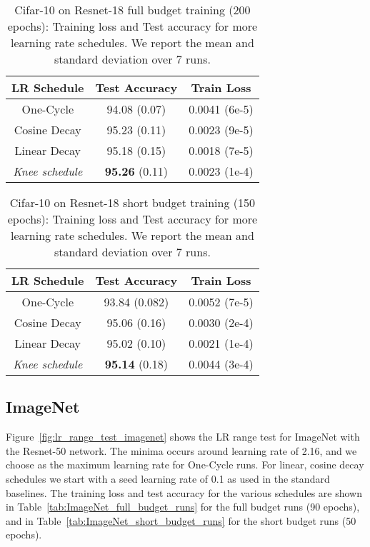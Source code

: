 \documentclass{article} \usepackage{iclr2021_conference,times}
\newcommand{\lrschedule}{\textit{Knee schedule}}
\begin{document}
\begin{table}[h!]
\small
\centering
\caption{Cifar-10 on Resnet-18 full budget training (200 epochs): Training loss and Test accuracy for more learning rate schedules. We report the mean and standard deviation over 7 runs.}
\label{tab:cifar_results_extra_baselines_full_budget}

\begin{tabular}{ccc}
  \toprule
  LR Schedule     & Test Accuracy  & Train Loss \\ 
  \midrule
  One-Cycle       & 94.08 (0.07)  & 0.0041 (6e-5) \\
  Cosine Decay    & 95.23 (0.11) & 0.0023 (9e-5)  \\
  Linear Decay    & 95.18 (0.15) & 0.0018 (7e-5)  \\
  \lrschedule{}   & \textbf{95.26} (0.11) & 0.0023 (1e-4)  \\ 
\bottomrule
\end{tabular}

\end{table}

\begin{table}[h!]
\small
\centering
\caption{Cifar-10 on Resnet-18 short budget training (150 epochs): Training loss and Test accuracy for more learning rate schedules. We report the mean and standard deviation over 7 runs.}
\label{tab:cifar_results_extra_baselines_short_budget}

\begin{tabular}{ccc}
  \toprule
  LR Schedule   & Test Accuracy   & Train Loss  \\ 
  \midrule
  One-Cycle     & 93.84 (0.082)    & 0.0052 (7e-5)   \\
  Cosine Decay   & 95.06 (0.16)    & 0.0030 (2e-4)\\
  Linear Decay    & 95.02 (0.10)  & 0.0021 (1e-4) \\
  \lrschedule{}   & \textbf{95.14} (0.18) & 0.0044 (3e-4)  \\ 
  \bottomrule
\end{tabular}

\end{table}

\subsection{ImageNet}
Figure~\ref{fig:lr_range_test_imagenet} shows the LR range test for ImageNet with the Resnet-50 network. The minima occurs around learning rate of 2.16, and we choose  as the maximum learning rate for One-Cycle runs. For linear, cosine decay schedules we start with a seed learning rate of 0.1 as used in the standard baselines. The training loss and test accuracy for the various schedules are shown in Table~\ref{tab:ImageNet_full_budget_runs} for the full budget runs (90 epochs), and in Table~\ref{tab:ImageNet_short_budget_runs} for the short budget runs (50 epochs).
\end{document}
